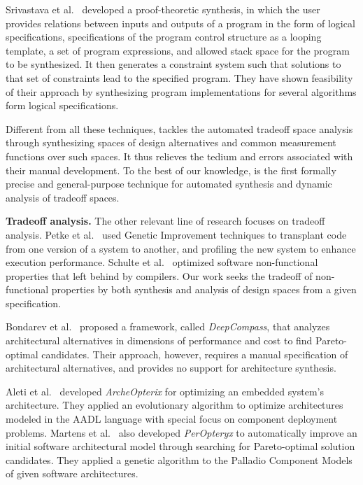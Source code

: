 \documentclass[10pt,conference]{IEEEtran}
\begin{document}
Srivastava et al.~\cite{srivastava_program_2010} developed a proof-theoretic synthesis, in which the user provides relations between inputs and outputs of a program in the form of logical specifications, specifications of the program control structure as a looping template, a set of program expressions, and allowed stack space for the program to be synthesized. It then generates a constraint system such that solutions to that set of constraints lead to the specified program. They have shown feasibility of their approach by synthesizing program implementations for several algorithms form logical specifications.

Different from all these techniques, \@approach tackles the automated tradeoff space analysis through synthesizing spaces of design alternatives and common measurement functions over such spaces. It thus relieves the tedium and errors associated with their manual development. To the best of our knowledge, \@approach is the first formally precise and general-purpose technique for automated synthesis and dynamic analysis of tradeoff spaces.

\textbf{Tradeoff analysis.}
The other relevant line of research focuses on tradeoff analysis.
Petke et al.~\cite{genetic_Improvement_code_transplate} used Genetic Improvement techniques to transplant code from one version of a system to another, and profiling the new system to enhance execution performance. Schulte et al.~\cite{post_compiler_optimize} optimized software non-functional properties that left behind by compilers. Our work seeks the tradeoff of non-functional properties by both synthesis and analysis of design spaces from a given specification.

Bondarev et al.~\cite{Bondarev_etal_2007} proposed a framework, called \emph{DeepCompass}, that analyzes architectural alternatives in dimensions of performance and cost to find Pareto-optimal candidates. Their approach, however, requires a manual specification of architectural alternatives, and provides no support for architecture synthesis.

Aleti et al.~\cite{ArcheOpterix} developed \emph{ArcheOpterix} for optimizing an embedded system's architecture.
They applied an evolutionary algorithm to optimize architectures modeled in the AADL language with special focus on component deployment problems.
Martens et al.~\cite{PerOpteryx} also developed \emph{PerOpteryx} to automatically improve an initial software architectural model through searching for Pareto-optimal solution candidates. They applied a genetic algorithm to the Palladio Component Models of given software architectures.
\end{document}
